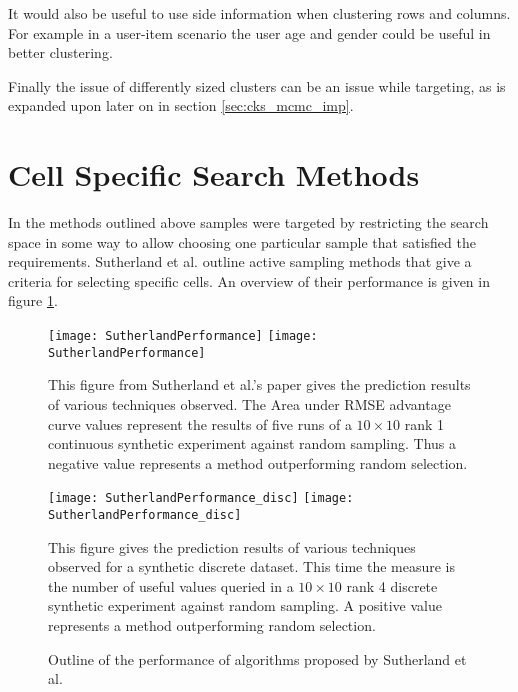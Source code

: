 It would also be useful to use side information when clustering rows and columns. For example in a user-item scenario the user age and gender could be useful in better clustering.

Finally the issue of differently sized clusters can be an issue while targeting, as is expanded upon later on in section \ref{sec:cks_mcmc_imp}.  



\section{Cell Specific Search Methods}
In the methods outlined above samples were targeted by restricting the search space in some way to allow choosing one particular sample that satisfied the requirements. Sutherland et al. \cite{active-mf} outline active sampling methods that give a criteria for selecting specific cells. An overview of their performance is given in figure \ref{fig:sutherland_alg}.
\begin{figure}[!htbp]
  \begin{center}
    \leavevmode
    \ifpdf
      \texttt{[image: SutherlandPerformance]}
    \else
      \texttt{[image: SutherlandPerformance]}
    \fi
    \end{center}
This figure from Sutherland et al.'s paper \cite{active-mf} gives the prediction results of various techniques observed. The Area under RMSE advantage curve values represent the results of five runs of a $10 \times 10$ rank 1 continuous synthetic experiment against random sampling. Thus a negative value represents a method outperforming random selection.
  \begin{center}
    \leavevmode
    \ifpdf
      \texttt{[image: SutherlandPerformance\_disc]}
    \else
      \texttt{[image: SutherlandPerformance\_disc]}
    \fi
    \end{center}
This figure gives the prediction results of various techniques observed for a synthetic discrete dataset. This time the measure is the number of useful values queried in a  $10 \times 10$ rank 4 discrete synthetic experiment against random sampling. A positive value represents a method outperforming random selection.

    \caption{Outline of the performance of algorithms proposed by Sutherland et al.}
    \label{fig:sutherland_alg}
\end{figure}

